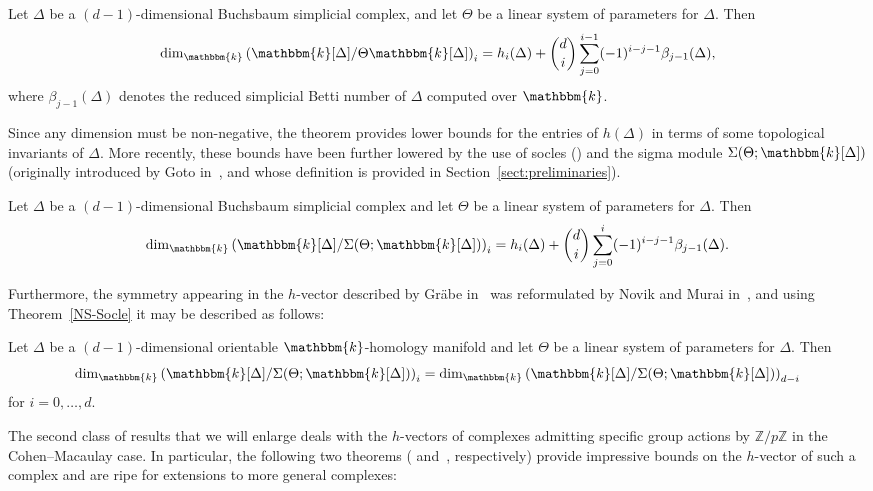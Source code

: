 \documentclass[ALCO,ThmDefs,Unicode]{cedram}
\newcommand{\field}{\mathbbm{k}}
\newcommand{\ZZ}{{\mathbb Z}}
\begin{document}
\begin{theo}[Schenzel]\label{Schenzel}
Let $\Delta$ be a $(d-1)$-dimensional Buchsbaum simplicial complex, and let $\Theta$ be a linear system of parameters for $\Delta$. Then
\[
\dim_\field \left(\field[\Delta]/\Theta\field[\Delta]\right)_i= h_i(\Delta)+\binom{d}{i}\sum_{j=0}^{i-1}(-1)^{i-j-1}\beta_{j-1}(\Delta),
\]
where $\beta_{j-1}(\Delta)$ denotes the reduced simplicial Betti number of $\Delta$ computed over $\field$.
\end{theo}

Since any dimension must be non-negative, the theorem provides lower bounds for the entries of $h(\Delta)$ in terms of some topological invariants of $\Delta$. More recently, these bounds have been further lowered by the use of socles (\cite{NS-Socle}) and the sigma module $\Sigma(\Theta; \field[\Delta])$ (originally introduced by Goto in~\cite{Goto}, and whose definition is provided in Section~\ref{sect:preliminaries}).

\begin{theo}\label{NS-Socle}
Let $\Delta$ be a $(d-1)$-dimensional Buchsbaum simplicial complex
and let $\Theta$ be a linear system of parameters for $\Delta$. Then
\[
\dim_\field \left(\field[\Delta]/\Sigma(\Theta; \field[\Delta])\right)_i= h_i(\Delta)+\binom{d}{i}\sum_{j=0}^{i}(-1)^{i-j-1}\beta_{j-1}(\Delta).
\]
\end{theo}

Furthermore, the symmetry appearing in the $h$-vector described by Gr\"abe in~\cite{GrabeDS} was reformulated by Novik and Murai in~\cite[Proposition~1.1]{FaceNumbers}, and using Theorem~\ref{NS-Socle} it may be described as follows:

\begin{theo}\label{Duality}
Let $\Delta$ be a $(d-1)$-dimensional %
orientable $\mathbbm{k}$-homology manifold
and let $\Theta$ be a linear system of parameters for $\Delta$. Then
\[
\dim_\field \left(\field[\Delta]/\Sigma(\Theta; \field[\Delta])\right)_i=\dim_\field \left(\field[\Delta]/\Sigma(\Theta; \field[\Delta])\right)_{d-i}
\]
for $i=0, \ldots, d$.
\end{theo}

The second class of results that we will enlarge deals with the $h$-vectors of complexes admitting specific group actions by $\ZZ/p\ZZ$ in the Cohen--Macaulay case. In particular, the following two theorems (\cite[Theorem~3.2]{St-87} and~\cite[Theorem~3.3]{AdinThesis}, respectively) provide impressive bounds on the $h$-vector of such a complex and are ripe for extensions to more general complexes:
\end{document}
